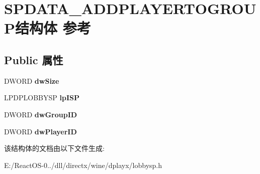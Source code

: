 \hypertarget{struct_s_p_d_a_t_a___a_d_d_p_l_a_y_e_r_t_o_g_r_o_u_p}{}\section{S\+P\+D\+A\+T\+A\+\_\+\+A\+D\+D\+P\+L\+A\+Y\+E\+R\+T\+O\+G\+R\+O\+U\+P结构体 参考}
\label{struct_s_p_d_a_t_a___a_d_d_p_l_a_y_e_r_t_o_g_r_o_u_p}
\subsection*{Public 属性}
\begin{DoxyCompactItemize}
\item 
\mbox{\label{struct_s_p_d_a_t_a___a_d_d_p_l_a_y_e_r_t_o_g_r_o_u_p_a3d9f8d76135883ed77282e2d31141652}} 
D\+W\+O\+RD {\bfseries dw\+Size}
\item 
\mbox{\label{struct_s_p_d_a_t_a___a_d_d_p_l_a_y_e_r_t_o_g_r_o_u_p_a9f64889170bd65a532c2eb6031ddc1fe}} 
L\+P\+D\+P\+L\+O\+B\+B\+Y\+SP {\bfseries lp\+I\+SP}
\item 
\mbox{\label{struct_s_p_d_a_t_a___a_d_d_p_l_a_y_e_r_t_o_g_r_o_u_p_a690c504ab16e942bb323303993a3e209}} 
D\+W\+O\+RD {\bfseries dw\+Group\+ID}
\item 
\mbox{\label{struct_s_p_d_a_t_a___a_d_d_p_l_a_y_e_r_t_o_g_r_o_u_p_ad9581b9637bba2893ce03ea336925ea4}} 
D\+W\+O\+RD {\bfseries dw\+Player\+ID}
\end{DoxyCompactItemize}


该结构体的文档由以下文件生成\+:\begin{DoxyCompactItemize}
\item 
E\+:/\+React\+O\+S-\/0../dll/directx/wine/dplayx/lobbysp.\+h\end{DoxyCompactItemize}
